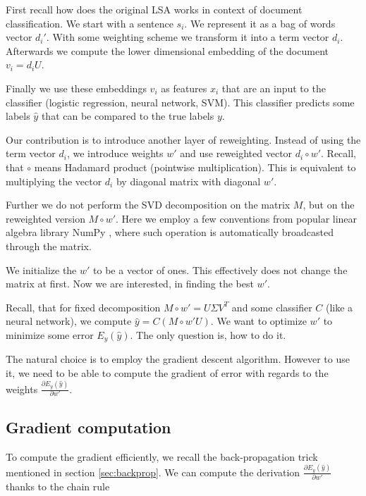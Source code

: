     First recall how does the original LSA works in context of document classification.
    We start with a sentence $s_i$. We represent it as a bag of words vector $d_i'$. 
    With some weighting scheme we transform it into a term vector $d_i$.
    Afterwards we compute the lower dimensional embedding of the document $v_i = d_i U$. 
    
    Finally we use these embeddings $v_i$ as features $x_i$ that are an input to the classifier (logistic regression, neural network, SVM).
    This classifier predicts some labels $\hat{y}$ that can be compared to
    the true labels $y$.
    
    Our contribution is to introduce another layer of reweighting. 
    Instead of using the term vector $d_i$, we introduce weights $w'$ and use reweighted vector $d_i \circ w'$.
    Recall, that $\circ$ means Hadamard product (pointwise multiplication).
    This is equivalent to multiplying the vector $d_i$ by diagonal matrix with diagonal $w'$.
    
    Further we do not perform the SVD decomposition on the matrix $M$, 
    but on the reweighted version $M \circ w'$. 
    Here we employ a few conventions from popular linear algebra library NumPy \cite{oliphant2006guide}, 
    where such operation is automatically broadcasted through the matrix.
    
    We initialize the $w'$ to be a vector of ones. 
    This effectively does not change the matrix at first.
    Now we are interested, in finding the best $w'$. 
    
    Recall, that for fixed decomposition $M\circ w'= U\Sigma V^T$ and some classifier $C$ (like a neural network),
    we compute $\hat{y} = C(M \circ w' U)$.
    We want to optimize $w'$ to minimize some error $E_y(\hat{y})$.
    The only question is, how to do it.
    
    The natural choice is to employ the gradient descent algorithm. 
    However to use it, we need to be able to compute the gradient of error with regards to the weights $\frac{\partial E_y(\hat{y})}{\partial w'}$.
    
    \subsection{Gradient computation}
    
    To compute the gradient efficiently, we recall the back-propagation trick mentioned in section \ref{sec:backprop}.
    We can compute the derivation $\frac{\partial E_y(\hat{y})}{\partial w'}$ thanks to the chain rule
    
